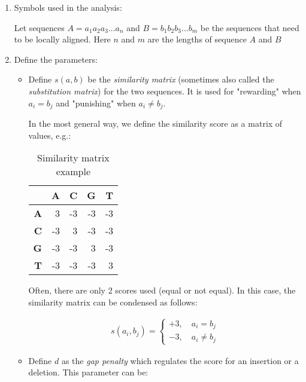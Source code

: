 \begin{enumerate}
	\item Symbols used in the analysis:
	
	Let sequences $A = a_1 a_2 a_3 \dots a_n$ and $B = b_1 b_2 b_3 \dots b_m$ be the sequences that need to be locally aligned. Here $n$ and $m$ are the lengths of sequence $A$ and $B$
	
	\item Define the parameters: 
	
	\begin{itemize}
		\item Define $s(a,b)$ be the \emph{similarity matrix} (sometimes also called the \emph{substitution matrix}) for the two sequences. It is used for "rewarding" when $a_i = b_j$ and "punishing" when $a_i \neq b_j$.
		
		In the most general way, we define the similarity score as a matrix of values, e.g.:
		
		\begin{table}[H]
			\centering
			\begin{tabular}{|r|r|r|r|r|}
				\hline
				& \textbf{A} & \textbf{C} & \textbf{G} & \textbf{T} \\ \hline
				\textbf{A} & 3          & -3         & -3         & -3         \\ \hline
				\textbf{C} & -3         & 3          & -3         & -3         \\ \hline
				\textbf{G} & -3         & -3         & 3          & -3         \\ \hline
				\textbf{T} & -3         & -3         & -3         & 3          \\ \hline
			\end{tabular}
			
			\caption{\centering Similarity matrix example}
		\end{table}
		
		Often, there are only 2 scores used (equal or not equal). In this case, the similarity matrix can be condensed as follows:
		
		\begin{align*}
		s(a_i,b_j)=
		\begin{cases}
		+3, \quad a_i=b_j     \\
		-3, \quad a_i\neq b_j
		\end{cases}
		\end{align*}
		
		\item Define $d$ as the \emph{gap penalty} which regulates the score for an insertion or a deletion. This parameter can be:
		

\end{itemize}
\end{enumerate}
